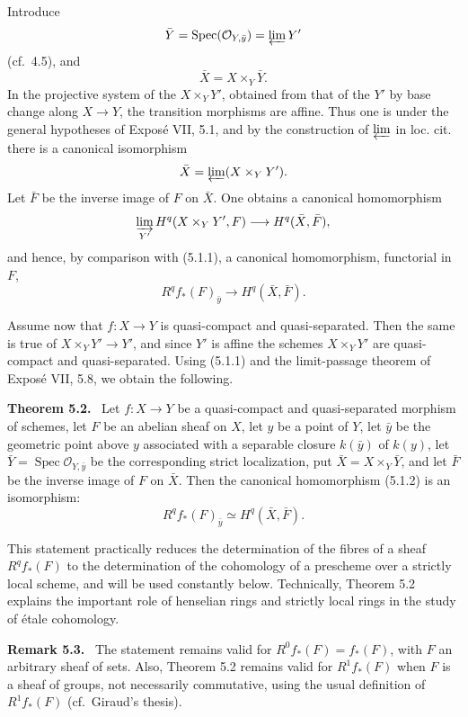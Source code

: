 \documentclass[11pt]{article}
\newcommand{\Oo}{\mathcal{O}}
\newcommand{\Spec}{\operatorname{Spec}}
\newcommand{\cf}{cf.\ }
\newenvironment{statement}[1]{\par\medskip\noindent\textbf{#1.}\ }{\par\medskip}
\newenvironment{remarktext}[1]{\par\medskip\noindent\textbf{#1.}\ }{\par\medskip}
\begin{document}
Introduce
\[
\bar Y=\Spec(\Oo_{Y,\bar y})=\varprojlim Y'
\]
(\cf 4.5), and
\[
\bar X=X\times_Y\bar Y.
\]
In the projective system of the \(X\times_YY'\), obtained from that of the \(Y'\) by base change along \(X\to Y\), the transition morphisms are affine. Thus one is under the general hypotheses of Expos\'e VII, 5.1, and by the construction of \(\varprojlim\) in loc. cit. there is a canonical isomorphism
\[
\bar X=\varprojlim (X\times_YY').
\]
Let \(\bar F\) be the inverse image of \(F\) on \(\bar X\). One obtains a canonical homomorphism
\[
\varinjlim_{Y'} H^q(X\times_YY',F)\longrightarrow H^q(\bar X,\bar F),
\]
and hence, by comparison with (5.1.1), a canonical homomorphism, functorial in \(F\),
\[
R^qf_*(F)_{\bar y}\longrightarrow H^q(\bar X,\bar F).
\tag{5.1.2}
\]

Assume now that \(f:X\to Y\) is quasi-compact and quasi-separated. Then the same is true of \(X\times_YY'\to Y'\), and since \(Y'\) is affine the schemes \(X\times_YY'\) are quasi-compact and quasi-separated. Using (5.1.1) and the limit-passage theorem of Expos\'e VII, 5.8, we obtain the following.

\begin{statement}{Theorem 5.2}
Let \(f:X\to Y\) be a quasi-compact and quasi-separated morphism of schemes, let \(F\) be an abelian sheaf on \(X\), let \(y\) be a point of \(Y\), let \(\bar y\) be the geometric point above \(y\) associated with a separable closure \(k(\bar y)\) of \(k(y)\), let \(\bar Y=\Spec\Oo_{Y,\bar y}\) be the corresponding strict localization, put \(\bar X=X\times_Y\bar Y\), and let \(\bar F\) be the inverse image of \(F\) on \(\bar X\). Then the canonical homomorphism (5.1.2) is an isomorphism:
\[
R^qf_*(F)_{\bar y}\simeq H^q(\bar X,\bar F).
\]
\end{statement}

This statement practically reduces the determination of the fibres of a sheaf \(R^qf_*(F)\) to the determination of the cohomology of a prescheme over a strictly local scheme, and will be used constantly below. Technically, Theorem 5.2 explains the important role of henselian rings and strictly local rings in the study of \'etale cohomology.

\begin{remarktext}{Remark 5.3}
The statement remains valid for \(R^0f_*(F)=f_*(F)\), with \(F\) an arbitrary sheaf of sets. Also, Theorem 5.2 remains valid for \(R^1f_*(F)\) when \(F\) is a sheaf of groups, not necessarily commutative, using the usual definition of \(R^1f_*(F)\) (\cf Giraud's thesis).
\end{remarktext}
\end{document}
